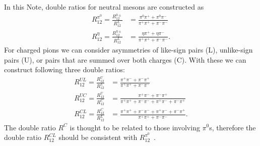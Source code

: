 In this Note, double ratios for neutral mesons are constructed as
\begin{equation}
\label{eqn:FF6}
\begin{aligned}
R_{12}^{\pi^0}=\frac{R^{0\pm}_{12}}{R^L_{12}}&=\frac{\pi^0\pi^++\pi^0\pi^-}{\pi^+\pi^++\pi^-\pi^-}\\
R_{12}^{\eta}=\frac{R^{\eta\pm}_{12}}{R^L_{12}}&=\frac{\eta\pi^++\eta\pi^-}{\pi^+\pi^++\pi^-\pi^-}.
\end{aligned}
\end{equation}
For charged pions we can consider asymmetries of like-sign pairs (L), unlike-sign pairs (U), or pairs that are summed over both charges (C).
With these we can construct following three double ratios:
%
\begin{equation}
\label{eqn:FF7}
\begin{aligned}
R_{12}^{UL}=\frac{R^{U}_{12}}{R^L_{12}}&=\frac{\pi^+\pi^-+\pi^-\pi^+}{\pi^+\pi^++\pi^-\pi^-}\\
R_{12}^{UC}=\frac{R^{U}_{12}}{R^C_{12}}&=\frac{\pi^+\pi^-+\pi^-\pi^+}{\pi^+\pi^++\pi^-\pi^-+\pi^+\pi^-+\pi^-\pi^+}\\
R_{12}^{CL}=\frac{R^{C}_{12}}{R^L_{12}}&=\frac{\pi^+\pi^++\pi^-\pi^-+\pi^+\pi^-+\pi^-\pi^+}{\pi^+\pi^++\pi^-\pi^-}.
\end{aligned}
\end{equation}
%
The double ratio $R^C$ is thought to be related to those involving $\pi^0$s, therefore the double ratio $R_{12}^{CL}$ should be consistent with $R_{12}^{\pi^0}$~\cite{Efremov:2006qm}.


